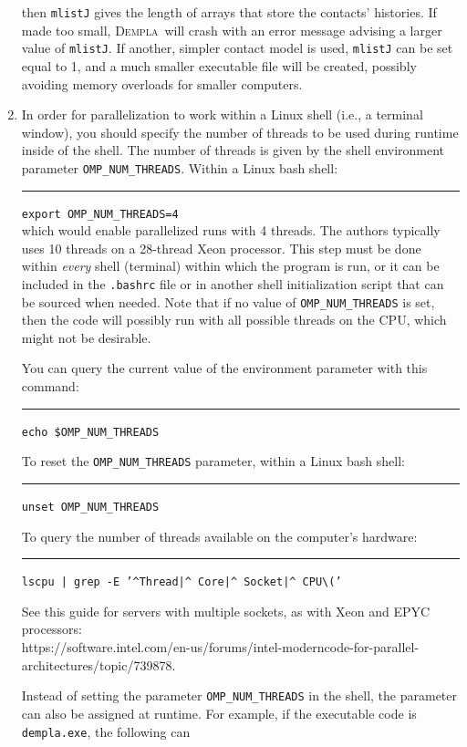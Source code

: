 \documentclass[letterpaper,11pt]{article}
\newcommand{\Dempla}{\textsc{Dempla}}
\begin{document}
\begin{enumerate}
then \texttt{mlistJ} gives the length of arrays that
store the contacts' histories.
If made too small, \Dempla\ will crash with an error
message advising a larger value of \texttt{mlistJ}.
If another, simpler contact model is used,
\texttt{mlistJ} can be set equal to 1,
and a much smaller executable file will be created,
possibly avoiding memory overloads for smaller computers.
%
\item
In order for parallelization to work within a Linux
shell (i.e., a terminal window),
you should specify the number
of threads to be used during runtime inside of the shell.
The number of threads is given by
the shell environment parameter \texttt{OMP\_NUM\_THREADS}.
Within a Linux
bash shell:\\
\rule{3ex}{0ex}\texttt{export OMP\_NUM\_THREADS=4}\\
which would enable parallelized runs with 4 threads.
The authors typically uses 10 threads on a 28-thread Xeon processor.
This step must be done within \emph{every} shell (terminal)
within which the program is run,
or it can be included in the \texttt{.bashrc} file or in
another shell initialization script that can be sourced when needed.
Note that if no value of \texttt{OMP\_NUM\_THREADS} is set, then the
code will possibly run with all possible threads on the CPU,
which might not be desirable.
\par
You can query the current value
of the environment parameter with this command:\\
    \rule{3ex}{0ex}\texttt{echo \$OMP\_NUM\_THREADS}
\par
To reset the \texttt{OMP\_NUM\_THREADS} parameter,
within a Linux bash shell:\\
\rule{3ex}{0ex}\texttt{unset OMP\_NUM\_THREADS}
\par
To query the number of threads available on the computer's hardware:\\
 \rule{3ex}{0ex}\texttt{lscpu | grep -E '\textasciicircum Thread|\textasciicircum
 Core|\textasciicircum
 Socket|\textasciicircum
 CPU\textbackslash('}
\par
See this guide for servers with multiple sockets, as with
Xeon and EPYC processors:\\
 https://software.intel.com/en-us/forums/intel-moderncode-for-parallel-architectures/topic/739878.
\par
Instead of setting the parameter
\texttt{OMP\_NUM\_THREADS}
in the shell, the
parameter can also be assigned at runtime.  For example,
if the executable code is 
\texttt{dempla.exe}, the following can

\end{enumerate}
\end{document}
